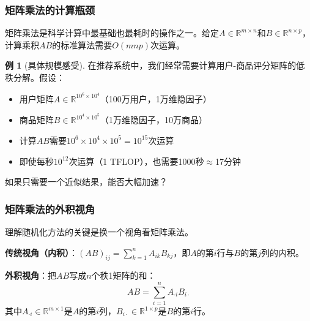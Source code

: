 \documentclass[11pt,a4paper]{ctexart}
\theoremstyle{definition}
\newtheorem{example}[theorem]{例}
\theoremstyle{remark}
\begin{document}
\subsubsection{矩阵乘法的计算瓶颈}

矩阵乘法是科学计算中最基础也最耗时的操作之一。给定$A \in \mathbb{R}^{m \times n}$和$B \in \mathbb{R}^{n \times p}$，计算乘积$AB$的标准算法需要$O(mnp)$次运算。

\begin{example}[具体规模感受]
在推荐系统中，我们经常需要计算用户-商品评分矩阵的低秩分解。假设：
\begin{itemize}
    \item 用户矩阵$A \in \mathbb{R}^{10^6 \times 10^4}$（100万用户，1万维隐因子）
    \item 商品矩阵$B \in \mathbb{R}^{10^4 \times 10^5}$（1万维隐因子，10万商品）
    \item 计算$AB$需要$10^6 \times 10^4 \times 10^5 = 10^{15}$次运算
    \item 即使每秒$10^{12}$次运算（1 TFLOP），也需要1000秒$\approx$17分钟
\end{itemize}
如果只需要一个近似结果，能否大幅加速？
\end{example}

\subsubsection{矩阵乘法的外积视角}

理解随机化方法的关键是换一个视角看矩阵乘法。

\textbf{传统视角（内积）}：$(AB)_{ij} = \sum_{k=1}^n A_{ik} B_{kj}$，即$A$的第$i$行与$B$的第$j$列的内积。

\textbf{外积视角}：把$AB$写成$n$个秩1矩阵的和：
\[
AB = \sum_{i=1}^n A_{\cdot i} B_{i \cdot}
\]
其中$A_{\cdot i} \in \mathbb{R}^{m \times 1}$是$A$的第$i$列，$B_{i \cdot} \in \mathbb{R}^{1 \times p}$是$B$的第$i$行。
\end{document}
